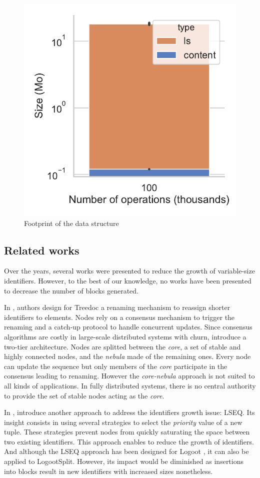 \documentclass[sigplan,10pt]{acmart}
\begin{document}
\begin{figure}
    \centering
    \includegraphics[width=0.55\columnwidth]{img/overhead-size.pdf}
    \caption{Footprint of the data structure}
    \label{fig:overhead-size}
\end{figure}

\subsection{Related works}

Over the years, several works were presented to reduce the growth of variable-size identifiers.
However, to the best of our knowledge, no works have been presented to decrease the number of blocks generated.

In \cite{letia:hal-01248270,zawirski:hal-01248197}, authors design for Treedoc \cite{5158449} a renaming mechanism to reassign shorter identifiers to elements.
Nodes rely on a consensus mechanism to trigger the renaming and a catch-up protocol to handle concurrent updates.
Since consensus algorithms are costly in large-scale distributed systems with churn, \citet{letia:hal-01248270} introduce a two-tier architecture.
Nodes are splitted between the \emph{core}, a set of stable and highly connected nodes, and the \emph{nebula} made of the remaining ones.
Every node can update the sequence but only members of the \emph{core} participate in the consensus leading to renaming.
However the \emph{core-nebula} approach is not suited to all kinds of applications.
In fully distributed systems, there is no central authority to provide the set of stable nodes acting as the \emph{core}.

In \cite{nedelec_2013_lseq,doi:10.1002/cpe.4108}, \citeauthor{nedelec_2013_lseq} introduce another approach to address the identifiers growth issue: LSEQ.
Its insight consists in using several strategies to select the \emph{priority} value of a new tuple.
These strategies prevent nodes from quickly saturating the space between two existing identifiers.
This approach enables to reduce the growth of identifiers.
And although the LSEQ approach has been designed for Logoot \cite{WeissICDCS09}, it can also be applied to LogootSplit.
However, its impact would be diminished as insertions into blocks result in new identifiers with increased sizes nonetheless.
\end{document}

